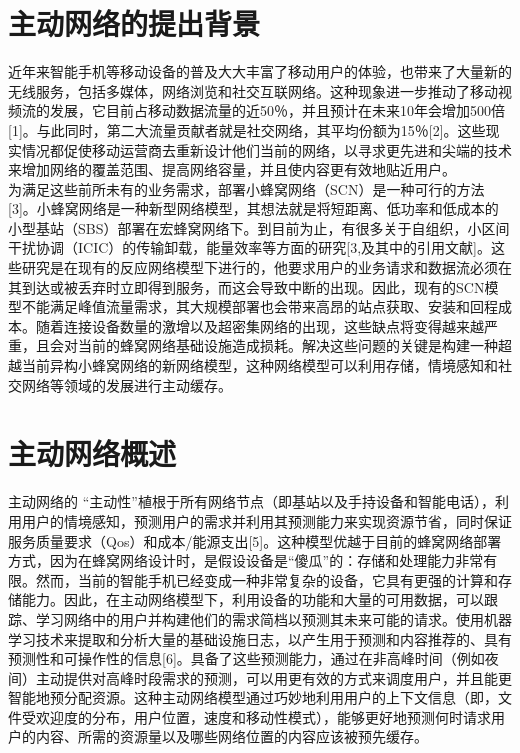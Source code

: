 \documentclass[bachelor]{seuthesis} %
\begin{document}
\begin{Main}
\section{主动网络的提出背景}
近年来智能手机等移动设备的普及大大丰富了移动用户的体验，也带来了大量新的无线服务，包括多媒体，网络浏览和社交互联网络。这种现象进一步推动了移动视频流的发展，它目前占移动数据流量的近50％，并且预计在未来10年会增加500倍[1]。与此同时，第二大流量贡献者就是社交网络，其平均份额为15％[2]。这些现实情况都促使移动运营商去重新设计他们当前的网络，以寻求更先进和尖端的技术来增加网络的覆盖范围、提高网络容量，并且使内容更有效地贴近用户。\\
为满足这些前所未有的业务需求，部署小蜂窝网络（SCN）是一种可行的方法 [3]。小蜂窝网络是一种新型网络模型，其想法就是将短距离、低功率和低成本的小型基站（SBS）部署在宏蜂窝网络下。到目前为止，有很多关于自组织，小区间干扰协调（ICIC）的传输卸载，能量效率等方面的研究[3,及其中的引用文献]。这些研究是在现有的反应网络模型下进行的，他要求用户的业务请求和数据流必须在其到达或被丢弃时立即得到服务，而这会导致中断的出现。因此，现有的SCN模型不能满足峰值流量需求，其大规模部署也会带来高昂的站点获取、安装和回程成本。随着连接设备数量的激增以及超密集网络的出现，这些缺点将变得越来越严重，且会对当前的蜂窝网络基础设施造成损耗。解决这些问题的关键是构建一种超越当前异构小蜂窝网络的新网络模型，这种网络模型可以利用存储，情境感知和社交网络等领域的发展进行主动缓存。
\section{主动网络概述}
主动网络的 “主动性”植根于所有网络节点（即基站以及手持设备和智能电话），利用用户的情境感知，预测用户的需求并利用其预测能力来实现资源节省，同时保证服务质量要求（Qos）和成本/能源支出[5]。这种模型优越于目前的蜂窝网络部署方式，因为在蜂窝网络设计时，是假设设备是“傻瓜”的：存储和处理能力非常有限。然而，当前的智能手机已经变成一种非常复杂的设备，它具有更强的计算和存储能力。因此，在主动网络模型下，利用设备的功能和大量的可用数据，可以跟踪、学习网络中的用户并构建他们的需求简档以预测其未来可能的请求。使用机器学习技术来提取和分析大量的基础设施日志，以产生用于预测和内容推荐的、具有预测性和可操作性的信息[6]。具备了这些预测能力，通过在非高峰时间（例如夜间）主动提供对高峰时段需求的预测，可以用更有效的方式来调度用户，并且能更智能地预分配资源。这种主动网络模型通过巧妙地利用用户的上下文信息（即，文件受欢迎度的分布，用户位置，速度和移动性模式），能够更好地预测何时请求用户的内容、所需的资源量以及哪些网络位置的内容应该被预先缓存。

\end{Main}
\end{document}
